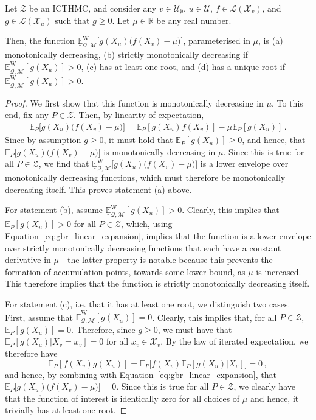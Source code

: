 \documentclass[twoside,11pt]{article}
\newcommand{\reals}{\mathbb{R}}
\newcommand{\states}{\mathcal{X}}
\newcommand{\lexp}{\underline{\mathbb{E}}_{\rateset,\mathcal{M}}^\mathrm{W}}
\newcommand{\uexp}{\overline{\mathbb{E}}_{\rateset,\mathcal{M}}^\mathrm{W}}
\newcommand{\gambles}{\mathcal{L}}
\newcommand{\rateset}{\mathcal{Q}}
\begin{document}
\begin{lemma}\label{lemma:general_gbr_is_monotone_and_has_root}
Let $\mathcal{Z}$ be an ICTHMC, and consider any $v\in\mathcal{U}_\emptyset$, $u\in\mathcal{U}$, $f\in\gambles(\states_v)$, and $g\in\gambles(\states_u)$ such that $g\geq 0$. Let $\mu\in\reals$ be any real number. 

Then, the function $\lexp\bigl[g(X_u)\bigl(f(X_v) - \mu\bigr)\bigr]$, parameterised in $\mu$, is (a) monotonically decreasing, (b) strictly monotonically decreasing if $\lexp[g(X_u)]>0$, (c) has at least one root, and (d) has a unique root if $\lexp[g(X_u)]>0$.
\end{lemma}
\begin{proof}
We first show that this function is monotonically decreasing in $\mu$. To this end, fix any $P\in\mathcal{Z}$. Then, by linearity of expectation,
\begin{align}\label{eq:gbr_linear_expansion}
\mathbb{E}_P\bigl[g(X_u)\bigl(f(X_v) - \mu\bigr)\bigr] = \mathbb{E}_P[g(X_u)f(X_v)] - \mu\mathbb{E}_P[g(X_u)]\,.
\end{align}
Since by assumption $g\geq 0$, it must hold that $\mathbb{E}_P[g(X_u)]\geq 0$, and hence, that $\mathbb{E}_P\bigl[g(X_u)\bigl(f(X_v) - \mu\bigr)\bigr]$ is monotonically decreasing in $\mu$. Since this is true for all $P\in\mathcal{Z}$, we find that $\lexp\bigl[g(X_u)\bigl(f(X_v) - \mu\bigr)\bigr]$ is a lower envelope over monotonically decreasing functions, which must therefore be monotonically decreasing itself. This proves statement (a) above.

For statement (b), assume $\lexp[g(X_u)]>0$. Clearly, this implies that $\mathbb{E}_P[g(X_u)]>0$ for all $P\in\mathcal{Z}$, which, using Equation~\ref{eq:gbr_linear_expansion}, implies that the function is a lower envelope over strictly monotonically decreasing functions that each have a constant derivative in $\mu$---the latter property is notable because this prevents the formation of accumulation points, towards some lower bound, as $\mu$ is increased. This therefore implies that the function is strictly monotonically decreasing itself.

For statement (c), i.e. that it has at least one root, we distinguish two cases. First, assume that $\uexp[g(X_u)]=0$. Clearly, this implies that, for all $P\in\mathcal{Z}$, $\mathbb{E}_P[g(X_u)]=0$. Therefore, since $g\geq 0$, we must have that $\mathbb{E}_P[g(X_u)\vert X_v=x_v]=0$ for all $x_v\in\states_v$. By the law of iterated expectation, we therefore have
\begin{equation*}
\mathbb{E}_P[f(X_v)g(X_u)] = \mathbb{E}_P\bigl[f(X_v)\mathbb{E}_P[g(X_u)\vert X_v]\bigr] = 0\,,
\end{equation*}
and hence, by combining with Equation~\ref{eq:gbr_linear_expansion}, that $\mathbb{E}_P\bigl[g(X_u)\bigl(f(X_v) - \mu\bigr)\bigr]=0$. Since this is true for all $P\in\mathcal{Z}$, we clearly have that the function of interest is identically zero for all choices of $\mu$ and hence, it trivially has at least one root.


\end{proof}
\end{document}
